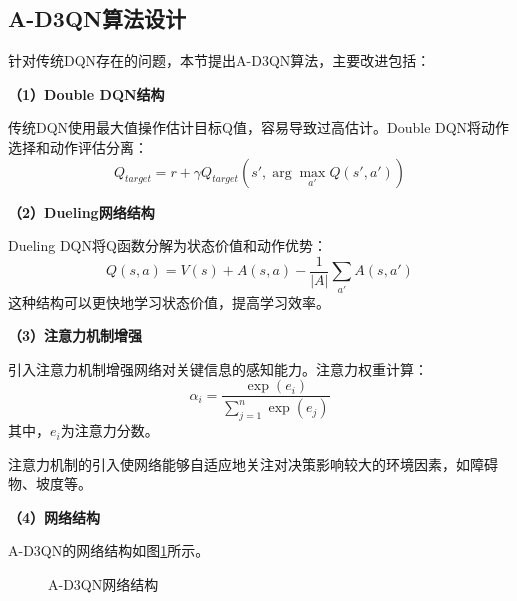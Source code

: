 \subsection{A-D3QN算法设计}
\label{subsec:ad3qn_design}

针对传统DQN存在的问题，本节提出A-D3QN算法，主要改进包括：

\textbf{（1）Double DQN结构}

传统DQN使用最大值操作估计目标Q值，容易导致过高估计。Double DQN\cite{ref35}将动作选择和动作评估分离：
\begin{equation}
    Q_{target} = r + \gamma Q_{target}(s', \arg\max_{a'} Q(s', a'))
    \label{eq:double_dqn}
\end{equation}

\textbf{（2）Dueling网络结构}

Dueling DQN\cite{ref51}将Q函数分解为状态价值和动作优势：
\begin{equation}
    Q(s,a) = V(s) + A(s,a) - \frac{1}{|A|}\sum_{a'}A(s,a')
    \label{eq:dueling}
\end{equation}
这种结构可以更快地学习状态价值，提高学习效率。

\textbf{（3）注意力机制增强}

引入注意力机制\cite{ref52}增强网络对关键信息的感知能力。注意力权重计算：
\begin{equation}
    \alpha_i = \frac{\exp(e_i)}{\sum_{j=1}^{n}\exp(e_j)}
    \label{eq:attention}
\end{equation}
其中，$e_i$为注意力分数。

注意力机制的引入使网络能够自适应地关注对决策影响较大的环境因素，如障碍物、坡度等。

\textbf{（4）网络结构}

A-D3QN的网络结构如图\ref{fig:ad3qn}所示。

\begin{figure}[htbp]
    \centering
    \caption{A-D3QN网络结构}
    \label{fig:ad3qn}
\end{figure}

